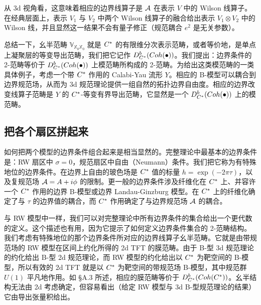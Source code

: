 从 3d 视角看，这意味着相应的边界线算子是 $\mathcal{A}$ 在表示 $V$ 中的 Wilson 线算子。在经典层面上，表示 $V_1$ 与 $V_2$ 中两个 Wilson 线算子的融合给出表示 $V_1\otimes V_2$ 中的 Wilson 线，并且显然这一结果不会有量子修正（规范耦合 $e^2$ 是无关参数）。


总结一下，幺半范畴 $\mathbb{V}_{\mathbb{X}_0\mathbb{X}_0}$ 就是 $C^*$ 的有限维分次表示范畴，或者等价地，是单点上凝聚层的等变导出范畴，我们把它记作 $D^b_{C^*}(Coh(\bullet))$。我们提出：边界条件的 2-范畴等价于 $D^b_{C^*}(Coh(\bullet))$ 上模范畴所构成的 2-范畴。为给出这类模范畴的一类具体例子，考虑一个带 $C^*$ 作用的 Calabi-Yau 流形 $Y$。相应的 B-模型可以耦合到边界规范场，从而为 3d 规范理论提供一组自然的拓扑边界自由度。相应的边界改变线算子范畴是 $Y$ 的 $C^*$-等变有界导出范畴，它显然是一个 $D^b_{C^*}(Coh(\bullet))$ 上的模范畴。

\subsection{把各个扇区拼起来}

如何把两个模型的边界条件组合起来是相当显然的。完整理论中最基本的边界条件是：RW 扇区中 $\sigma=0$，规范扇区中自由（Neumann）条件。我们把它称为有特殊地位的边界条件。在边界上自由的玻色场是 $C^*$ 值的标量 $h=\exp(-2\pi\tau)$，以及复规范场 $\mathcal{A}=A+i\phi$ 的限制。更一般的边界条件涉及纤维化在 $C^*$ 上、并容许一个 $C^*$ 作用的边界 B-模型或边界 Landau-Ginzburg 模型。在 $C^*$ 上的纤维化确定了与 $\tau$ 的边界值的耦合，而 $C^*$ 作用确定了与边界规范场 $\mathcal{A}$ 的耦合。

与 RW 模型中一样，我们可以对完整理论中所有边界条件的集合给出一个更代数的定义。这个描述也有用，因为它提示了如何定义边界条件集合的 2-范畴结构。我们考虑有特殊地位的那个边界条件所对应的边界线算子幺半范畴。它就是由带规范场的 RW 模型在区间上约化所得的 2d TFT 的膜范畴。由于 B-型 3d 规范理论的约化给出 B-型 2d 规范理论，而 RW 模型的约化给出以 $C^*$ 为靶空间的 B-模型，所以有效的 2d TFT 就是以 $C^*$ 为靶空间的带规范场 B-模型，其中规范群 $U(1)$ 平凡地作用。如 §A.3 所述，相应的膜范畴等价于 $D^b_{C^*}(Coh(C^*))$。幺半结构无法由 2d 考虑确定，但容易看出（给定 RW 模型与 3d B-型规范理论的结果）它由导出张量积给出。



